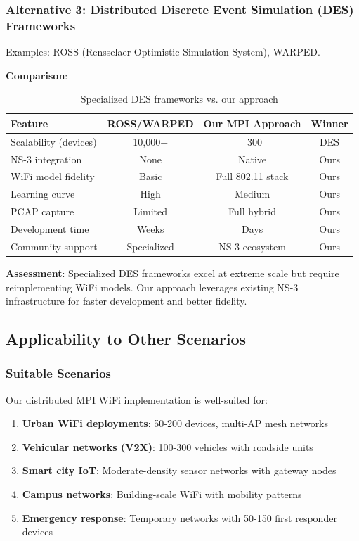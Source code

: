 \subsubsection{Alternative 3: Distributed Discrete Event Simulation (DES) Frameworks}

Examples: ROSS (Rensselaer Optimistic Simulation System), WARPED.

\textbf{Comparison}:
\begin{table}[htbp]
\centering
\caption{Specialized DES frameworks vs. our approach}
\label{tab:des-comparison}
\small
\begin{tabular}{@{}lccc@{}}
\toprule
\textbf{Feature} & \textbf{ROSS/WARPED} & \textbf{Our MPI Approach} & \textbf{Winner} \\
\midrule
Scalability (devices) & 10,000+ & ~300 & DES \\
NS-3 integration & None & Native & Ours \\
WiFi model fidelity & Basic & Full 802.11 stack & Ours \\
Learning curve & High & Medium & Ours \\
PCAP capture & Limited & Full hybrid & Ours \\
Development time & Weeks & Days & Ours \\
Community support & Specialized & NS-3 ecosystem & Ours \\
\bottomrule
\end{tabular}
\end{table}

\textbf{Assessment}: Specialized DES frameworks excel at extreme scale but require reimplementing WiFi models. Our approach leverages existing NS-3 infrastructure for faster development and better fidelity.

\subsection{Applicability to Other Scenarios}

\subsubsection{Suitable Scenarios}

Our distributed MPI WiFi implementation is well-suited for:

\begin{enumerate}
    \item \textbf{Urban WiFi deployments}: 50-200 devices, multi-AP mesh networks
    \item \textbf{Vehicular networks (V2X)}: 100-300 vehicles with roadside units
    \item \textbf{Smart city IoT}: Moderate-density sensor networks with gateway nodes
    \item \textbf{Campus networks}: Building-scale WiFi with mobility patterns
    \item \textbf{Emergency response}: Temporary networks with 50-150 first responder devices
\end{enumerate}

